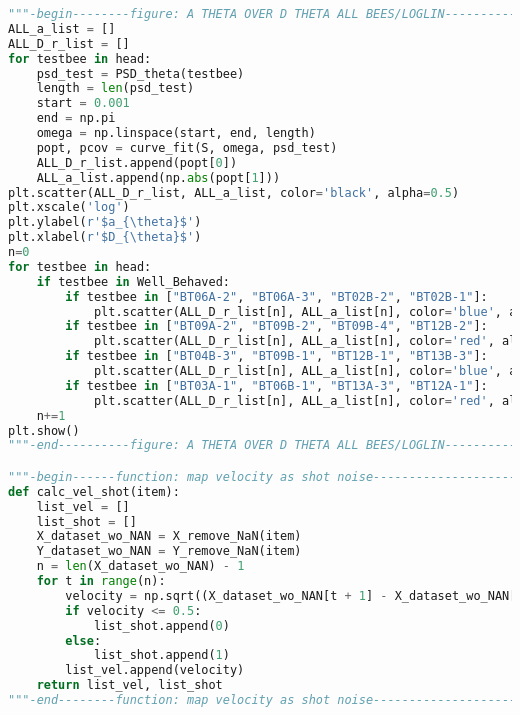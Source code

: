 \begin{lstlisting}[language=Python, basicstyle=\tiny, frame=single, keywordstyle=\color{teal}, commentstyle=\color{olive}, stringstyle=\color{red}]
"""-begin--------figure: A THETA OVER D THETA ALL BEES/LOGLIN----------------"""
ALL_a_list = []
ALL_D_r_list = []
for testbee in head:
    psd_test = PSD_theta(testbee)
    length = len(psd_test)
    start = 0.001
    end = np.pi
    omega = np.linspace(start, end, length)
    popt, pcov = curve_fit(S, omega, psd_test)
    ALL_D_r_list.append(popt[0])
    ALL_a_list.append(np.abs(popt[1]))
plt.scatter(ALL_D_r_list, ALL_a_list, color='black', alpha=0.5)
plt.xscale('log')
plt.ylabel(r'$a_{\theta}$')
plt.xlabel(r'$D_{\theta}$')
n=0
for testbee in head:
    if testbee in Well_Behaved:
        if testbee in ["BT06A-2", "BT06A-3", "BT02B-2", "BT02B-1"]:
            plt.scatter(ALL_D_r_list[n], ALL_a_list[n], color='blue', alpha=1, marker='X', s=70)#, label=r'$IB_{1-4}$')
        if testbee in ["BT09A-2", "BT09B-2", "BT09B-4", "BT12B-2"]:
            plt.scatter(ALL_D_r_list[n], ALL_a_list[n], color='red', alpha=1, marker='X', s=70)#, label=r'$GF_{1-4}$')
        if testbee in ["BT04B-3", "BT09B-1", "BT12B-1", "BT13B-3"]:
            plt.scatter(ALL_D_r_list[n], ALL_a_list[n], color='blue', alpha=1, marker='P', s=70)#, label=r'$WF_{1-4}$')
        if testbee in ["BT03A-1", "BT06B-1", "BT13A-3", "BT12A-1"]:
            plt.scatter(ALL_D_r_list[n], ALL_a_list[n], color='red', alpha=1, marker='P', s=70)#, label=r'$RW_{1-4}$')
    n+=1
plt.show()
"""-end----------figure: A THETA OVER D THETA ALL BEES/LOGLIN----------------"""

"""-begin------function: map velocity as shot noise--------------------------"""
def calc_vel_shot(item):
    list_vel = []
    list_shot = []
    X_dataset_wo_NAN = X_remove_NaN(item)
    Y_dataset_wo_NAN = Y_remove_NaN(item)
    n = len(X_dataset_wo_NAN) - 1
    for t in range(n):
        velocity = np.sqrt((X_dataset_wo_NAN[t + 1] - X_dataset_wo_NAN[t]) ** 2 + (Y_dataset_wo_NAN[t + 1] - Y_dataset_wo_NAN[t]) ** 2)
        if velocity <= 0.5:
            list_shot.append(0)
        else:
            list_shot.append(1)
        list_vel.append(velocity)
    return list_vel, list_shot
"""-end--------function: map velocity as shot noise--------------------------"""


\end{lstlisting}
